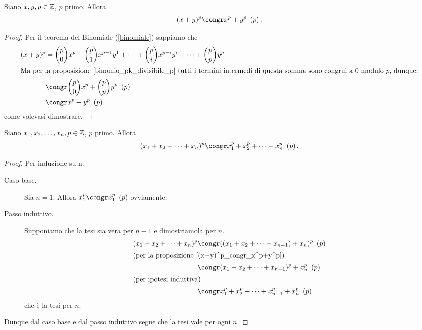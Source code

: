 \begin{proposition}\label{(x+y)^p_congr_x^p+y^p}
    Siano $x, y, p \in \mathbb{Z}$, $p$ primo. Allora
    \begin{equation}
        (x+y)^p \congr x^p + y^p \Mod{p}.
    \end{equation}
\end{proposition}
\begin{proof}
    Per il teorema del Binomiale (\ref{binomiale}) sappiamo che
    \begin{alignat*}{1}
        (x+y)^p &= \binom{p}{0}x^p + \binom{p}{1}x^{p-1}y^1 + \dots + \binom{p}{i}x^{p-i}y^i + \dots + \binom{p}{p}y^p \\
        \intertext{Ma per la proposizione \ref{binomio_pk_divisibile_p} tutti i termini intermedi di questa somma sono congrui a $0$ modulo $p$, dunque:}
        &\congr \binom{p}{0}x^p + \binom{p}{p}y^p \Mod{p}\\
        &\congr x^p + y^p \Mod{p}
    \end{alignat*}
    come volevasi dimostrare.
\end{proof}

\begin{corollary}\label{(x_1+x_n)^p_congr_x_1^p+x_n^p}
    Siano $x_1, x_2, \dots, x_n, p \in \mathbb{Z}$, $p$ primo. Allora
    \begin{equation}
        (x_1+x_2+\dots+x_n)^p \congr x_1^p + x_2^p + \dots + x_n^p \Mod{p}.
    \end{equation}
\end{corollary}
\begin{proof}
    Per induzione su n.
    \begin{description}
        \item[Caso base.]

        Sia $n = 1$. Allora $x_1^p \congr x_1^p \Mod{p}$ ovviamente.
        \item[Passo induttivo.]
        
        Supponiamo che la tesi sia vera per $n-1$ e dimostriamola per $n$.
        \begin{alignat*}{1}
            (x_1+x_2+\dots+x_n)^p &\congr ((x_1+x_2+\dots+x_{n-1})+x_n)^p \Mod{p}\\
            \intertext{(per la proposizione \ref{(x+y)^p_congr_x^p+y^p})}
            &\congr (x_1+x_2+\dots+x_{n-1})^p+x_n^p\Mod{p}\\
            \intertext{(per ipotesi induttiva)}
            &\congr x_1^p + x_2^p + \dots + x_{n-1}^p + x_n^p\Mod{p}
        \end{alignat*}
        che è la tesi per $n$.
    \end{description}
    Dunque dal caso base e dal passo induttivo segue che la tesi vale per ogni $n$.
\end{proof}

